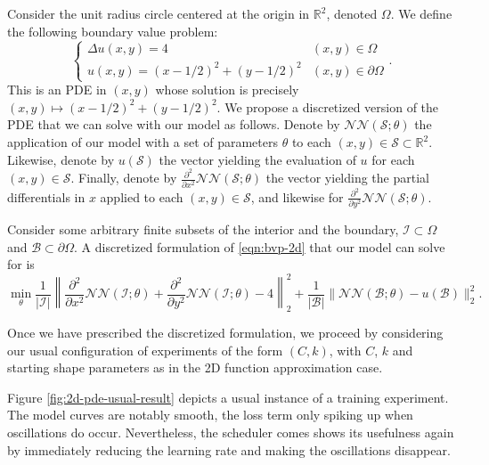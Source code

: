 \documentclass[12pt]{report} %
\begin{document}
Consider the unit radius circle centered at the origin in $\mathbb{R}^2$,
denoted $\Omega$. We define the following boundary value problem:
\begin{equation}
  \left\{\begin{array}{ll}
    \Delta u (x, y) = 4                      & (x, y) \in \Omega          \\
    u (x, y) = (x - 1 / 2)^2 + (y - 1 / 2)^2 & (x, y) \in \partial \Omega
  \end{array}\right. . \label{eqn:bvp-2d}
\end{equation}
This is an PDE in $(x, y)$ whose solution is precisely $(x, y) \mapsto (x - 1
  / 2)^2 + (y - 1 / 2)^2$. We propose a discretized version of the PDE that we
can solve with our model as follows. Denote by $\mathcal{N}\mathcal{N}
  (\mathcal{S}; \theta)$ the application of our model with a set of parameters
$\theta$ to each $(x, y) \in \mathcal{S} \subset \mathbb{R}^2$. Likewise,
denote by $u (\mathcal{S})$ the vector yielding the evaluation of $u$ for each
$(x, y) \in \mathcal{S}$. Finally, denote by $\frac{\partial^2}{\partial x^2}
  \mathcal{N}\mathcal{N} (\mathcal{S}; \theta)$ the vector yielding the partial
differentials in $x$ applied to each $(x, y) \in \mathcal{S}$, and likewise
for $\frac{\partial^2}{\partial y^2} \mathcal{N}\mathcal{N} (\mathcal{S};
  \theta)$.

Consider some arbitrary finite subsets of the interior and the boundary,
$\mathcal{I} \subset \Omega$ and $\mathcal{B} \subset \partial \Omega$. A
discretized formulation of \eqref{eqn:bvp-2d} that our model can solve for is
\[ \min_{\theta} \frac{1}{| \mathcal{I} |} \left\| \frac{\partial^2}{\partial
    x^2} \mathcal{N}\mathcal{N} (\mathcal{I}; \theta) +
  \frac{\partial^2}{\partial y^2} \mathcal{N}\mathcal{N} (\mathcal{I};
  \theta) - 4 \right\|_2^2 + \frac{1}{| \mathcal{B} |} \|
  \mathcal{N}\mathcal{N} (\mathcal{B}; \theta) - u (\mathcal{B}) \|_2^2 . \]

Once we have prescribed the discretized formulation, we proceed by considering our usual configuration of experiments of the form $(C,k)$, with $C$, $k$ and starting shape parameters as in the 2D function approximation case.

Figure \ref{fig:2d-pde-usual-result} depicts a usual instance of a training experiment. The model curves are notably smooth, the loss term only spiking up when oscillations do occur. Nevertheless, the scheduler comes shows its usefulness again by immediately reducing the learning rate and making the oscillations disappear.
\end{document}
